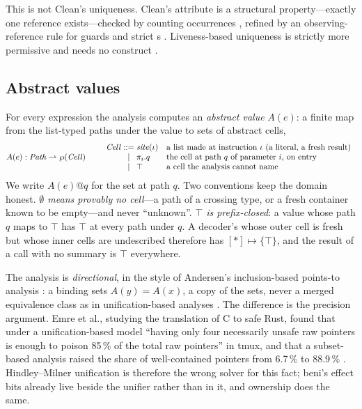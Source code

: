 This is not Clean's uniqueness. Clean's \code{*} attribute is a structural property---exactly one
reference exists---checked by counting occurrences \citep[Def.~8.14]{barendsen1996uniqueness},
refined by an observing-reference rule for guards and strict s
\citep[\S9.4]{plasmeijer2011clean}. Liveness-based uniqueness is strictly more permissive and needs
no  construct \citep{wadler1990linear}.

\subsection{Abstract values}
\label{sec:model-abstract}

For every expression the analysis computes an \emph{abstract value} $A(e)$: a finite map from the
list-typed paths under the value to sets of abstract cells,
\[
A(e) : \mathit{Path} \rightharpoonup \wp(\mathit{Cell})
\qquad
\begin{array}{r@{\;}c@{\;}l@{\quad}l}
\mathit{Cell} & ::= & \site(\iota) & \text{a list made at instruction } \iota \text{ (a literal, a fresh result)}\\
 & \mid & \pi_i.q & \text{the cell at path } q \text{ of parameter } i \text{, on entry}\\
 & \mid & \top & \text{a cell the analysis cannot name}
\end{array}
\]
We write $A(e)@q$ for the set at path $q$. Two conventions keep the domain honest. \emph{$\emptyset$
means provably no cell}---a path of a crossing type, or a fresh container known to be empty---and
never ``unknown''. \emph{$\top$ is prefix-closed}: a value whose path $q$ maps to $\top$ has $\top$
at every path under $q$. A decoder's  whose outer cell is fresh but whose inner
cells are undescribed therefore has $[\ast] \mapsto \{\top\}$, and the result of a call with no
summary is $\top$ everywhere.

The analysis is \emph{directional}, in the style of Andersen's inclusion-based points-to analysis
\citep{andersen1994program}: a binding  sets $A(y) = A(x)$, a copy of the sets, never a
merged equivalence class as in unification-based analyses \citep{steensgaard1996points}. The
difference is the precision argument. Emre et al., studying the translation of C to safe Rust,
found that under a unification-based model ``having only four necessarily unsafe raw pointers is
enough to poison 85\,\% of the total raw pointers'' in tmux, and that a subset-based analysis raised
the share of well-contained pointers from 6.7\,\% to 88.9\,\% \citep[\S5,
Table~2]{emre2023aliasing}. Hindley--Milner unification is therefore the wrong solver for this fact;
beni's effect bits already live beside the unifier rather than in it, and ownership does the same.

